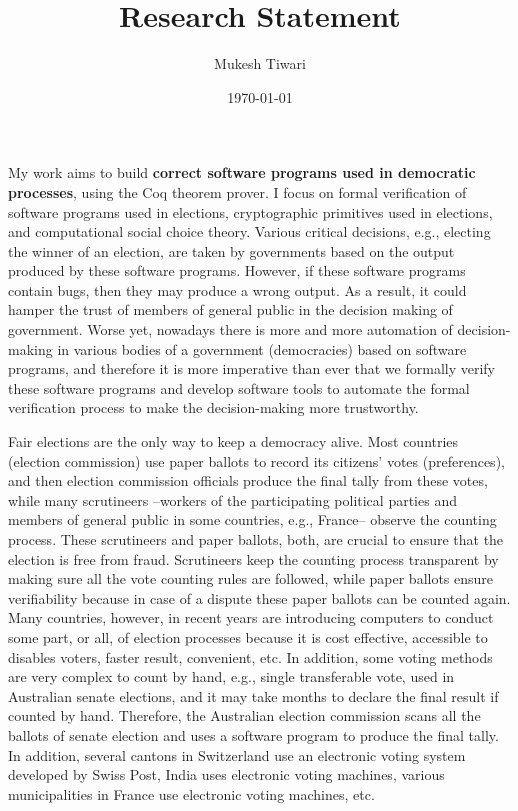 \documentclass[a4paper]{article}
\title{Research Statement}
\author{Mukesh Tiwari}
\date{\today}
\begin{document}
\fontsize{12}{15}
\selectfont
\maketitle

My work aims to build \textbf{correct software programs used in democratic processes}, 
using the Coq theorem prover. 
I focus on formal verification of software programs used in elections, 
cryptographic primitives used in elections, and computational social choice theory.  
Various critical decisions, e.g., electing the winner of an election, 
are taken by governments based on the output produced by these software programs. 
However, if these 
software programs contain bugs, then they may produce a wrong 
output. As a result, it could hamper the trust of  
members of general public in the decision making of government. 
Worse yet, nowadays there is more and more automation of decision-making 
in various bodies of a government (democracies) based on software programs, 
and therefore it is more imperative than ever  that  we formally verify these software programs and 
develop software tools to automate the formal verification process to make the decision-making more trustworthy. 

Fair elections are the only way to keep a democracy alive. Most countries (election commission) use paper ballots to record 
its citizens' votes (preferences), and then election commission officials produce the final tally from these votes, 
while many scrutineers --workers of the participating political parties and members of general public in 
some countries, e.g., France--  
observe the counting process. These scrutineers and paper ballots, both, are crucial to ensure that 
the election is free from fraud. Scrutineers keep the counting process transparent by making sure all the vote counting 
rules are followed, while paper ballots ensure verifiability because in case of a dispute these paper ballots 
can be counted again. Many countries, however, in recent years are introducing computers to conduct some part, or all, of 
election processes because it is cost effective, accessible to disables voters, faster result, convenient, etc. 
In addition, some voting methods are very complex to count by hand, e.g., 
single transferable vote, used in Australian senate elections, and it may take months to declare the final result if 
counted by hand. Therefore, the Australian election commission scans all the ballots of senate election and 
uses a software program to produce the final tally. In addition, several cantons in Switzerland use an electronic 
voting system developed by Swiss Post, India uses electronic voting machines, various municipalities in France 
use electronic voting machines, etc.
\end{document}
